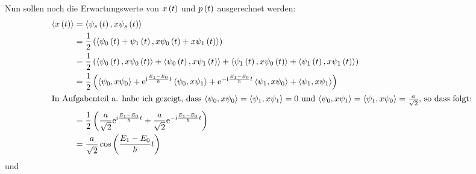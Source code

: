 \documentclass[11pt, ngerman, fleqn, DIV=15, headinclude]{scrartcl}
\begin{document}
Nun sollen noch die Erwartungswerte von $x\left( t \right)$ und $p\left( t \right)$ ausgerechnet werden:
\begin{align*}
	\left<x\del{t}\right>	&= \left<\psi_s\del{t},x\psi_s\del{t}\right>\\
							&= \half\del{\left<\psi_0\del{t}+\psi_1\del{t},x\psi_0\del{t}+x\psi_1\del{t}\right>}\\
							&= \half\del{\left<\psi_0\del{t},x\psi_0\del{t}\right> + \left<\psi_0\del{t},x\psi_1\del{t}\right> + \left<\psi_1\del{t},x\psi_0\del{t}\right> + \left<\psi_1\del{t},x\psi_1\del{t}\right>}\\
							&= \half\del{\left<\psi_0,x\psi_0\right> + \eup^{\iup\frac{E_1-E_0}{\hbar}t}\left<\psi_0,x\psi_1\right> + \eup^{-\iup\frac{E_1-E_0}{\hbar}t}\left<\psi_1,x\psi_0\right> + \left<\psi_1,x\psi_1\right>}\\
	\intertext{%
		In Aufgabenteil a. habe ich gezeigt, dass $\left<\psi_0,x\psi_0\right>=\left<\psi_1,x\psi_1\right>=0$ und $\left<\psi_0,x\psi_1\right>=\left<\psi_1,x\psi_0\right>=\frac{a}{\sqrt{2}}$, so dass folgt:
	}
							&= \half\del{\frac{a}{\sqrt{2}}\eup^{\iup\frac{E_1-E_0}{\hbar}t} + \frac{a}{\sqrt{2}}\eup^{-\iup\frac{E_1-E_0}{\hbar}t}}\\
							&= \frac{a}{\sqrt{2}}\cos\del{\frac{E_1-E_0}{\hbar}t}
\end{align*}
und 
\end{document}
